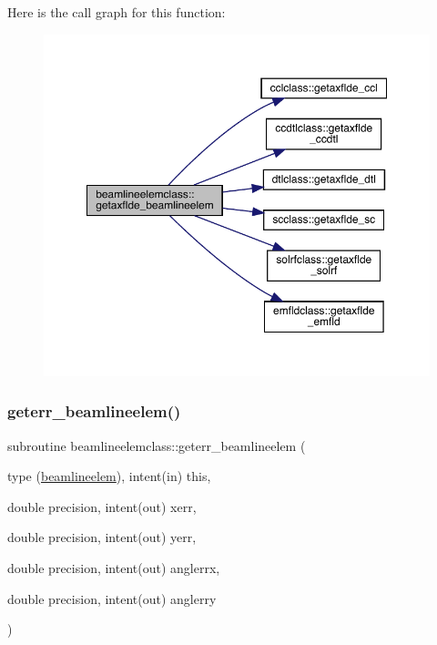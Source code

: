 Here is the call graph for this function\+:\nopagebreak
\begin{figure}[H]
\begin{center}
\leavevmode
\includegraphics[width=350pt]{namespacebeamlineelemclass_aa38d23f41bd5b34e31e784e1bb1b4ba2_cgraph}
\end{center}
\end{figure}
\mbox{\label{namespacebeamlineelemclass_aa02696ccb3d6d48bfdcb0ff3ea906fa1}} 
\subsubsection{\texorpdfstring{geterr\_beamlineelem()}{geterr\_beamlineelem()}}
{\footnotesize\ttfamily subroutine beamlineelemclass\+::geterr\+\_\+beamlineelem (\begin{DoxyParamCaption}\item[{type (\mbox{\hyperlink{namespacebeamlineelemclass_structbeamlineelemclass_1_1beamlineelem}{beamlineelem}}), intent(in)}]{this,  }\item[{double precision, intent(out)}]{xerr,  }\item[{double precision, intent(out)}]{yerr,  }\item[{double precision, intent(out)}]{anglerrx,  }\item[{double precision, intent(out)}]{anglerry }\end{DoxyParamCaption})}


